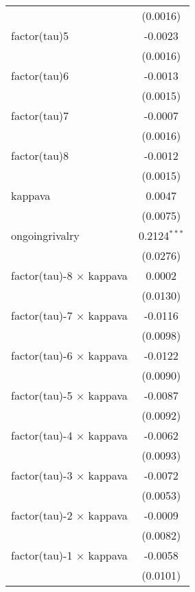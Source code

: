 \begin{tabular}{lc}
                                   & (0.0016)\\   
   factor(tau)5                    & -0.0023\\   
                                   & (0.0016)\\   
   factor(tau)6                    & -0.0013\\   
                                   & (0.0015)\\   
   factor(tau)7                    & -0.0007\\   
                                   & (0.0016)\\   
   factor(tau)8                    & -0.0012\\   
                                   & (0.0015)\\   
   kappava                         & 0.0047\\   
                                   & (0.0075)\\   
   ongoingrivalry                  & 0.2124$^{***}$\\   
                                   & (0.0276)\\   
   factor(tau)-8 $\times$ kappava  & 0.0002\\   
                                   & (0.0130)\\   
   factor(tau)-7 $\times$ kappava  & -0.0116\\   
                                   & (0.0098)\\   
   factor(tau)-6 $\times$ kappava  & -0.0122\\   
                                   & (0.0090)\\   
   factor(tau)-5 $\times$ kappava  & -0.0087\\   
                                   & (0.0092)\\   
   factor(tau)-4 $\times$ kappava  & -0.0062\\   
                                   & (0.0093)\\   
   factor(tau)-3 $\times$ kappava  & -0.0072\\   
                                   & (0.0053)\\   
   factor(tau)-2 $\times$ kappava  & -0.0009\\   
                                   & (0.0082)\\   
   factor(tau)-1 $\times$ kappava  & -0.0058\\   
                                   & (0.0101)\\   

\end{tabular}
